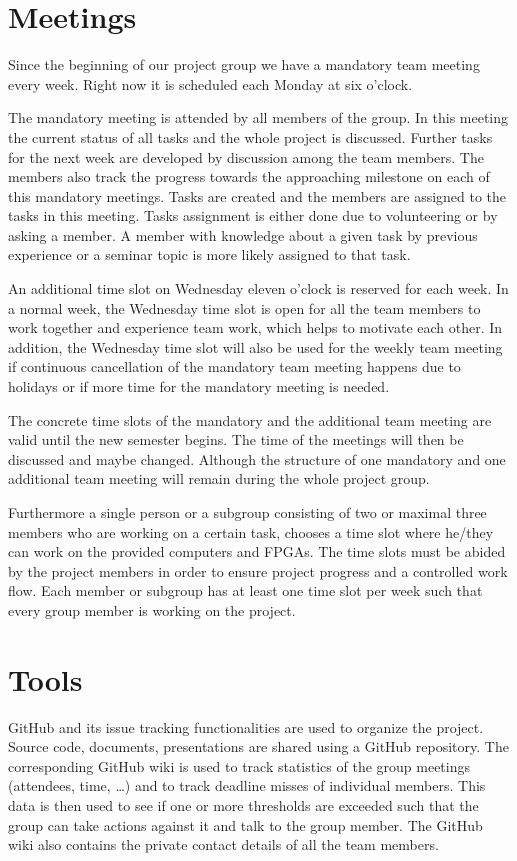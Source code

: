 \section{Meetings}
Since the beginning of our project group we have a mandatory team meeting every week.
Right now it is scheduled each Monday at six o'clock.

The mandatory meeting is attended by all members of the group.
In this meeting the current status of all tasks and the whole project is discussed.
Further tasks for the next week are developed by discussion among the team members.
The members also track the progress towards the approaching milestone on each of this mandatory meetings.
Tasks are created and the members are assigned to the tasks in this meeting. Tasks assignment is either done due to volunteering or by asking a member.
A member with knowledge about a given task by previous experience or a seminar topic is more likely assigned to that task.

An additional time slot on Wednesday eleven o'clock is reserved for each week.
In a normal week, the Wednesday time slot is open for all the team members to work together and experience team work, which helps to motivate each other.
In addition, the Wednesday time slot will also be used for the weekly team meeting if continuous cancellation of the mandatory team meeting happens due to holidays
or if more time for the mandatory meeting is needed.

The concrete time slots of the mandatory and the additional team meeting are valid until the new semester begins. The time of the meetings will then be discussed and maybe changed. Although the structure of one mandatory and one additional team meeting will remain during the whole project group.

Furthermore a single person or a subgroup consisting of two or maximal three members who are working on a certain task, chooses a time slot where he/they can work on the provided computers and \acp{FPGA}.
The time slots must be abided by the project members in order to ensure project progress and a controlled work flow.
Each member or subgroup has at least one time slot per week such that every group member is working on the project.

\section{Tools}

GitHub and its issue tracking functionalities are used to organize the project.
Source code, documents, presentations are shared using a GitHub repository.
The corresponding GitHub wiki is used to track statistics of the group meetings (attendees, time, \dots) and to track deadline misses of individual members.
This data is then used to see if one or more thresholds are exceeded such that the group can take actions against it and talk to the group member.
The GitHub wiki also contains the private contact details of all the team members.

